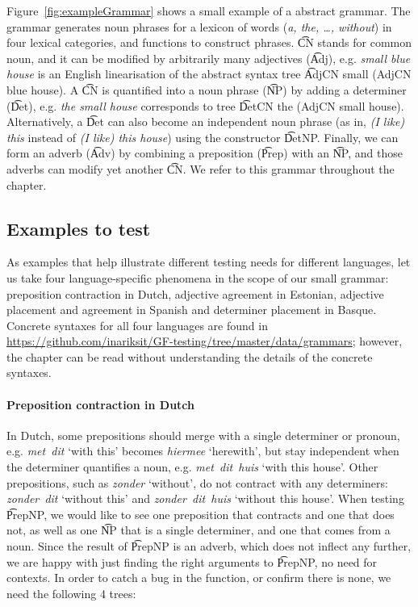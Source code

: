 Figure~\ref{fig:exampleGrammar} shows a small example of a \gf{}
abstract grammar. The grammar generates noun phrases for a lexicon of
\numOfLex{} words (\emph{a, the, \dots, without}) in four lexical
categories, and \numOfFun{} functions to construct phrases. \t{CN} stands
for common noun, and it can be modified by arbitrarily many adjectives
(\t{Adj}), e.g. \emph{small blue house} is an English linearisation of
the abstract syntax tree \t{AdjCN small (AdjCN blue house)}. A \t{CN}
is quantified into a noun phrase (\t{NP}) by adding a determiner
(\t{Det}), e.g. \emph{the small house} corresponds to tree \t{DetCN
  the (AdjCN small house)}. Alternatively, a \t{Det} can also become
an independent noun phrase (as in, \emph{(I like) this} instead of
\emph{(I like) this house}) using the constructor \t{DetNP}. Finally,
we can form an adverb (\t{Adv}) by combining a preposition (\t{Prep})
with an \t{NP}, and those adverbs can modify yet another \t{CN}.  We
refer to this grammar throughout the chapter.

\subsection{Examples to test}
\label{gf-testing-examples}

As examples that help illustrate different testing needs for different
languages, let us take four language-specific phenomena in the scope
of our small grammar: preposition contraction in Dutch, adjective
agreement in Estonian, adjective placement and agreement in Spanish
and determiner placement in Basque. Concrete syntaxes for all four
languages are found in
\url{https://github.com/inariksit/GF-testing/tree/master/data/grammars};
however, the chapter can be read without understanding the details of
the concrete syntaxes.

\paragraph{Preposition contraction in Dutch} In Dutch, some prepositions should
merge with a single determiner or pronoun, e.g. \emph{met~dit} `with
this' becomes \emph{hiermee} `herewith', but stay independent when the
determiner quantifies a noun, e.g. \emph{met~dit~huis} `with this house'.
Other prepositions, such as \emph{zonder} `without', do not
contract with any determiners: \emph{zonder~dit} `without this' and
\emph{zonder~dit~huis} `without this house'.
When testing \t{PrepNP}, we would like to see one preposition that
contracts and one that does not, as well as one \t{NP} that is a
single determiner, and one that comes from a noun. Since the result of
\t{PrepNP} is an adverb, which does not inflect any further, we are
happy with just finding the right arguments to \t{PrepNP}, no need for contexts.
In order to catch a bug in the function, or confirm there is none, we
need the following 4 trees:


